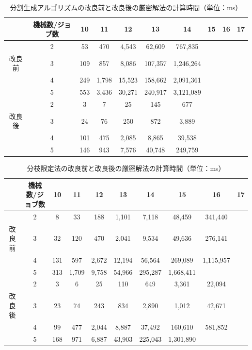 \documentclass[12pt]{optlab-bachelor}
\begin{document}
\begin{table}[htb]
  \setlength{\leftskip}{-15mm}
  \begin{tabular}{|c|c|c|c|c|c|c|c|c|c|} \hline
    & 機械数/ジョブ数 & 10 & 11 & 12 & 13 & 14 & 15 & 16 & 17 \\ \hline \hline
    & 2 & 53 & 470 & 4,543 & 62,609 & 767,835 &  &  &  \\ \cline{2-10}
    改良前 & 3 & 109 & 857 & 8,086 & 107,357 & 1,246,264 &  &  &  \\ \cline{2-10}
    & 4 & 249 & 1,798 & 15,523 & 158,662 & 2,091,361 &  &  &  \\ \cline{2-10}
    & 5 & 553 & 3,436 & 30,271 & 240,917 & 3,121,089 &  &  &  \\ \hline \hline
    & 2 & 3 & 7 & 25 & 145 & 677 &  &  &  \\ \cline{2-10}
    改良後 & 3 & 24 & 76 & 250 & 872 & 3,889 &  &  &  \\ \cline{2-10}
    & 4 & 101 & 475 & 2,085 & 8,865 & 39,538 &  &  &  \\ \cline{2-10}
    & 5 & 146 & 943 & 7,576 & 40,748 & 249,759 &  &  &  \\ \hline \hline
  \end{tabular}
  \caption{分割生成アルゴリズムの改良前と改良後の厳密解法の計算時間（単位：ms）}
\end{table}

\begin{table}[htb]
  \setlength{\leftskip}{-15mm}
  \begin{tabular}{|c|c|c|c|c|c|c|c|c|c|} \hline
    & 機械数/ジョブ数 & 10 & 11 & 12 & 13 & 14 & 15 & 16 & 17 \\ \hline \hline
    & 2 & 8 & 33 & 188 & 1,101 & 7,118 & 48,459 & 341,440 &  \\ \cline{2-10}
    改良前 & 3 & 32 & 120 & 470 & 2,041 & 9,534 & 49,636 & 276,141 &  \\ \cline{2-10}
    & 4 & 131 & 597 & 2,672 & 12,194 & 56,564 & 269,089 & 1,115,957 &  \\ \cline{2-10}
    & 5 & 313 & 1,709 & 9,758 & 54,966 & 295,287 & 1,668,411 &  & \\ \hline \hline
    & 2 & 3 & 6 & 25 & 110 & 649 & 3,361 & 22,094 &  \\ \cline{2-10}
    改良後 & 3 & 23 & 74 & 243 & 834 & 2,890 & 1,012 & 42,671 &  \\ \cline{2-10}
    & 4 & 99 & 477 & 2,044 & 8,887 & 37,492 & 160,610 & 581,852 &  \\ \cline{2-10}
    & 5 & 168 & 971 & 6,887 & 43,903 & 225,043 & 1,301,890 &  &  \\ \hline \hline
  \end{tabular}
  \caption{分枝限定法の改良前と改良後の厳密解法の計算時間（単位：ms）}
\end{table}
\end{document}
